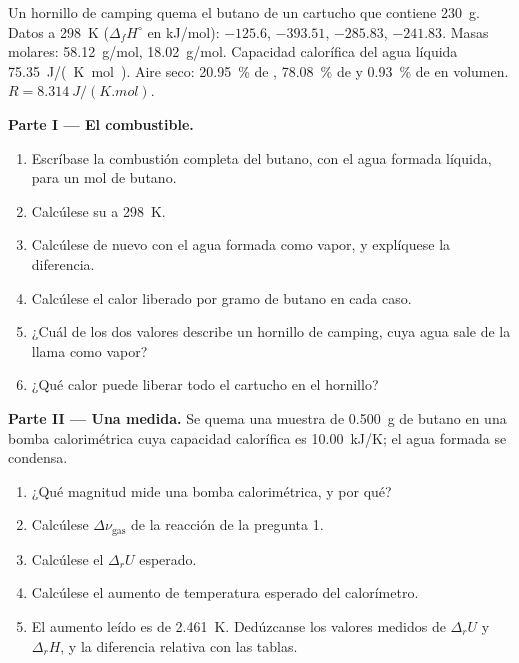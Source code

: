 \begin{problem}
\label{pb:b2:reaction-enthalpy:1}
Un hornillo de camping quema el butano de un cartucho que contiene \qty{230}{g}.
Datos a \qty{298}{K} ($\Delta_f H^\circ$ en \unit{kJ/mol}): 
$-125.6$,  $-393.51$,  $-285.83$, 
$-241.83$. Masas molares:  \qty{58.12}{g/mol}, 
\qty{18.02}{g/mol}. Capacidad calorífica del agua líquida
\qty{75.35}{J/(K.mol)}. Aire seco: \qty{20.95}{\percent} de ,
\qty{78.08}{\percent} de  y \qty{0.93}{\percent} de  en volumen. $R = \qty{8.314}{J/(K.mol)}$.

\medskip
\noindent\textbf{Parte I --- El combustible.}
\begin{enumerate}
  \item Escríbase la combustión completa del butano, con el agua formada líquida,
        para un mol de butano.
  \item Calcúlese su  a \qty{298}{K}.
  \item Calcúlese de nuevo con el agua formada como vapor, y explíquese la
        diferencia.
  \item Calcúlese el calor liberado por gramo de butano en cada caso.
  \item ¿Cuál de los dos valores describe un hornillo de camping, cuya agua
        sale de la llama como vapor?
  \item ¿Qué calor puede liberar todo el cartucho en el hornillo?
\end{enumerate}

\medskip
\noindent\textbf{Parte II --- Una medida.}
Se quema una muestra de \qty{0.500}{g} de butano en una bomba calorimétrica cuya
capacidad calorífica es \qty{10.00}{kJ/K}; el agua formada se condensa.
\begin{enumerate}[resume]
  \item ¿Qué magnitud mide una bomba calorimétrica, y por qué?
  \item Calcúlese $\Delta\nu_{\text{gas}}$ de la reacción de la pregunta 1.
  \item Calcúlese el $\Delta_r U$ esperado.
  \item Calcúlese el aumento de temperatura esperado del calorímetro.
  \item El aumento leído es de \qty{2.461}{K}. Dedúzcanse los valores medidos de $\Delta_r U$
        y $\Delta_r H$, y la diferencia relativa con las tablas.
\end{enumerate}


\end{problem}
